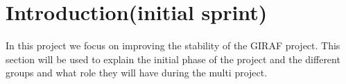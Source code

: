 \section{Introduction(initial sprint)}

In this project we focus on improving the stability of the GIRAF project. This
section will be used to explain the initial phase of the project and the
different groups and what role they will have during the multi project.

\subsection{}
